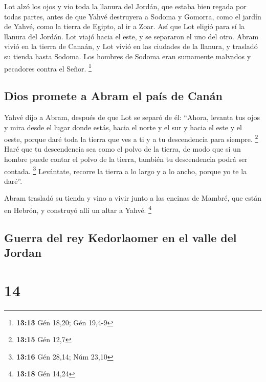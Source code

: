  Lot alzó los ojos y vio toda la llanura del Jordán, que
estaba bien regada por todas partes, antes de que Yahvé destruyera a
Sodoma y Gomorra, como el jardín de Yahvé, como la tierra de Egipto, al
ir a Zoar.  Así que Lot eligió para sí la llanura del
Jordán. Lot viajó hacia el este, y se separaron el uno del otro.
 Abram vivió en la tierra de Canaán, y Lot vivió en las
ciudades de la llanura, y trasladó su tienda hasta Sodoma.
 Los hombres de Sodoma eran sumamente malvados y
pecadores contra el Señor. \footnote{\textbf{13:13} Gén 18,20; Gén
  19,4-9}

\hypertarget{dios-promete-a-abram-el-pauxeds-de-canuxe1n}{%
\subsection{Dios promete a Abram el país de
Canán}\label{dios-promete-a-abram-el-pauxeds-de-canuxe1n}}

 Yahvé dijo a Abram, después de que Lot se separó de él:
``Ahora, levanta tus ojos y mira desde el lugar donde estás, hacia el
norte y el sur y hacia el este y el oeste,  porque daré
toda la tierra que ves a ti y a tu descendencia para siempre.
\footnote{\textbf{13:15} Gén 12,7}  Haré que tu
descendencia sea como el polvo de la tierra, de modo que si un hombre
puede contar el polvo de la tierra, también tu descendencia podrá ser
contada. \footnote{\textbf{13:16} Gén 28,14; Núm 23,10} 
Levántate, recorre la tierra a lo largo y a lo ancho, porque yo te la
daré''.

 Abram trasladó su tienda y vino a vivir junto a las
encinas de Mambré, que están en Hebrón, y construyó allí un altar a
Yahvé. \footnote{\textbf{13:18} Gén 14,24}

\hypertarget{guerra-del-rey-kedorlaomer-en-el-valle-del-jordan}{%
\subsection{Guerra del rey Kedorlaomer en el valle del
Jordan}\label{guerra-del-rey-kedorlaomer-en-el-valle-del-jordan}}

\hypertarget{section-13}{%
\section{14}\label{section-13}}

